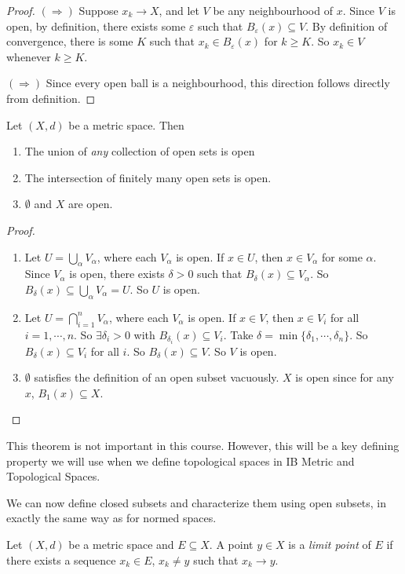 \documentclass[a4paper]{article}
\begin{document}
\begin{proof}
  $(\Rightarrow)$ Suppose $x_k \to X$, and let $V$ be any neighbourhood of $x$. Since $V$ is open, by definition, there exists some $\varepsilon$ such that $B_\varepsilon(x) \subseteq V$. By definition of convergence, there is some $K$ such that $x_k \in B_\varepsilon(x)$ for $k \geq K$. So $x_k \in V$ whenever $k \geq K$.

  $(\Rightarrow)$ Since every open ball is a neighbourhood, this direction follows directly from definition.
\end{proof}

\begin{thm}
  Let $(X, d)$ be a metric space. Then
  \begin{enumerate}
    \item The union of \emph{any} collection of open sets is open
    \item The intersection of finitely many open sets is open.
    \item $\emptyset$ and $X$ are open.
  \end{enumerate}
\end{thm}

\begin{proof}\leavevmode
  \begin{enumerate}
    \item Let $U = \bigcup_\alpha V_\alpha$, where each $V_\alpha$ is open. If $x\in U$, then $x\in V_\alpha$ for some $\alpha$. Since $V_\alpha$ is open, there exists $\delta > 0$ such that $B_\delta(x) \subseteq V_\alpha$. So $B_\delta (x) \subseteq \bigcup_\alpha V_\alpha = U$. So $U$ is open.
    \item Let $U = \bigcap_{i = 1}^n V_\alpha$, where each $V_\alpha$ is open. If $x\in V$, then $x\in V_i$ for all $i = 1, \cdots, n$. So $\exists \delta_i > 0$ with $B_{\delta_i}(x) \subseteq V_i$. Take $\delta = \min\{\delta_1, \cdots, \delta_n\}$. So $B_\delta(x) \subseteq V_i$ for all $i$. So $B_\delta(x) \subseteq V$. So $V$ is open.
    \item $\emptyset$ satisfies the definition of an open subset vacuously. $X$ is open since for any $x$, $B_1(x) \subseteq X$.
  \end{enumerate}
\end{proof}
This theorem is not important in this course. However, this will be a key defining property we will use when we define topological spaces in IB Metric and Topological Spaces.

We can now define closed subsets and characterize them using open subsets, in exactly the same way as for normed spaces.
\begin{defi}
  Let $(X, d)$ be a metric space and $E\subseteq X$. A point $y \in X$ is a \emph{limit point} of $E$ if there exists a sequence $x_k \in E$, $x_k \not= y$ such that $x_k \to y$.
\end{defi}
\end{document}
